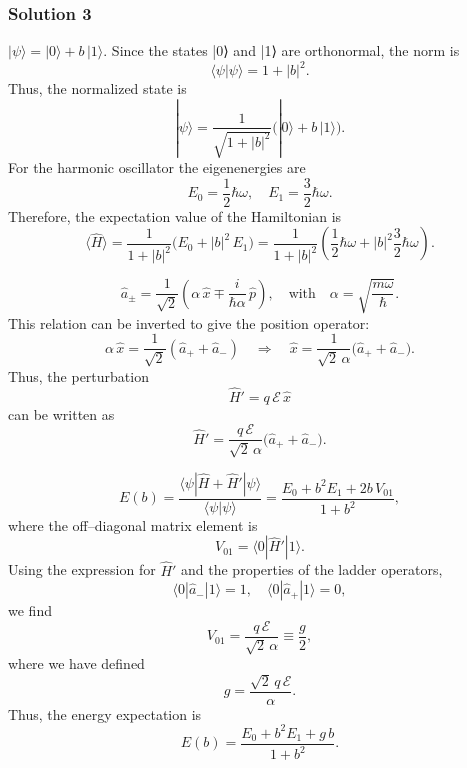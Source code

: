 \documentclass{article}
\begin{document}
\subsubsection{Solution 3}
$|\psi\rangle = |0\rangle + b\,|1\rangle.$
Since the states |0⟩ and |1⟩ are orthonormal, the norm is
\[
\langle \psi | \psi \rangle = 1 + |b|^2.
\]
Thus, the normalized state is
\[
|\psi\rangle = \frac{1}{\sqrt{1+|b|^2}} \Big(|0\rangle + b\,|1\rangle\Big).
\]
For the harmonic oscillator the eigenenergies are
\[
E_0 = \frac{1}{2}\hbar\omega,\quad E_1 = \frac{3}{2}\hbar\omega.
\]
Therefore, the expectation value of the Hamiltonian is
\[
\langle \hat{H} \rangle = \frac{1}{1+|b|^2}\Big( E_0 + |b|^2\,E_1 \Big)
=\frac{1}{1+|b|^2}\left(\frac{1}{2}\hbar\omega + |b|^2\frac{3}{2}\hbar\omega\right).
\]

\[
\hat{a}_\pm = \frac{1}{\sqrt{2}}\left(\alpha\,\hat{x}\mp \frac{i}{\hbar\alpha}\,\hat{p}\right),
\quad \text{with} \quad \alpha=\sqrt{\frac{m\omega}{\hbar}}.
\]
This relation can be inverted to give the position operator:
\[
\alpha\,\hat{x} = \frac{1}{\sqrt{2}}(\hat{a}_+ + \hat{a}_-)
\quad\Longrightarrow\quad
\hat{x} = \frac{1}{\sqrt{2}\,\alpha}\Big(\hat{a}_+ + \hat{a}_-\Big).
\]
Thus, the perturbation
\[
\hat{H}' = q\,\mathcal{E}\,\hat{x}
\]
can be written as
\[
\hat{H}' = \frac{q\,\mathcal{E}}{\sqrt{2}\,\alpha}\Big(\hat{a}_+ + \hat{a}_-\Big).
\]

\[
E(b) = \frac{\langle \psi | \hat{H}+\hat{H}' | \psi \rangle}{\langle \psi|\psi\rangle}
=\frac{E_0 + b^2 E_1 + 2b\,V_{01}}{1+b^2},
\]
where the off–diagonal matrix element is
\[
V_{01} = \langle 0|\hat{H}'|1\rangle.
\]
Using the expression for \(\hat{H}'\) and the properties of the ladder operators,
\[
\langle 0|\hat{a}_-|1\rangle = 1,\quad \langle 0|\hat{a}_+|1\rangle = 0,
\]
we find
\[
V_{01} = \frac{q\,\mathcal{E}}{\sqrt{2}\,\alpha} \equiv \frac{g}{2},
\]
where we have defined
\[
g = \frac{\sqrt{2}\,q\,\mathcal{E}}{\alpha}.
\]
Thus, the energy expectation is
\[
E(b) = \frac{E_0 + b^2 E_1 + g\,b}{1+b^2}.
\]
\end{document}

